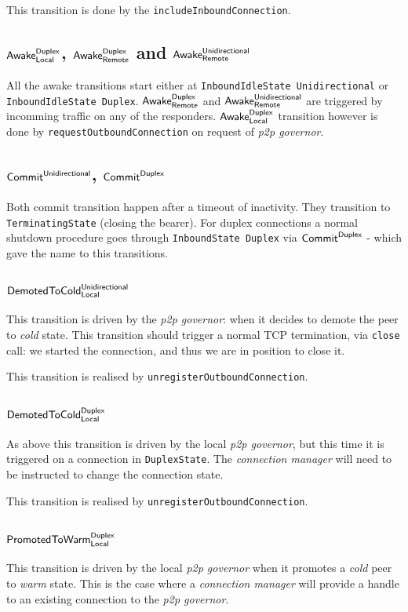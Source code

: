 \documentclass{article}
\def\TCP{\textsf{TCP}}
\def\InboundStateDup{\texttt{InboundState Duplex}}
\def\InboundIdleStateUni{\texttt{InboundIdleState Unidirectional}}
\def\InboundIdleStateDup{\texttt{InboundIdleState Duplex}}
\def\TerminatingState{\texttt{TerminatingState}}
\def\PromotedToWarmDupLoc{$\text{\textsf{PromotedToWarm}}^\text{\textsf{Duplex}}_\text{\textsf{Local}}$}
\def\DemotedToColdDupLoc{$\text{\textsf{DemotedToCold}}^\text{\textsf{Duplex}}_\text{\textsf{Local}}$}
\def\DemotedToColdUniLoc{$\text{\textsf{DemotedToCold}}^\text{\textsf{Unidirectional}}_\text{\textsf{Local}}$}
\def\CommitDup{$\text{\textsf{Commit}}^\text{\textsf{Duplex}}$}
\def\CommitUni{$\text{\textsf{Commit}}^\text{\textsf{Unidirectional}}$}
\def\AwakeDupRem{$\text{\textsf{Awake}}^\text{\textsf{Duplex}}_\text{\textsf{Remote}}$}
\def\AwakeUniRem{$\text{\textsf{Awake}}^\text{\textsf{Unidirectional}}_\text{\textsf{Remote}}$}
\def\AwakeDupLoc{$\text{\textsf{Awake}}^\text{\textsf{Duplex}}_\text{\textsf{Local}}$}
\def\cold{\textit{cold}}
\def\warm{\textit{warm}}
\def\ptopgov{\textit{p2p governor}}
\def\connmngr{\textit{connection manager}}
\begin{document}
This transition is done by the \texttt{includeInboundConnection}.

\subsection{\AwakeDupLoc{}, \AwakeDupRem{} and \AwakeUniRem{}}
All the awake transitions start either at \InboundIdleStateUni{} or
\InboundIdleStateDup{}.  \AwakeDupRem{} and \AwakeUniRem{} are triggered by
incomming traffic on any of the responders. \AwakeDupLoc{} transition however
is done by \texttt{requestOutboundConnection} on request of \ptopgov{}.

\subsection{\CommitUni{}, \CommitDup{}}\label{sec:tr_commit}
Both commit transition happen after a timeout of inactivity.  They transition
to \TerminatingState{} (closing the bearer).  For duplex connections a normal
shutdown procedure goes through \InboundStateDup{} via \CommitDup{} - which
gave the name to this transitions.

\subsection{\DemotedToColdUniLoc{}}
This transition is driven by the \ptopgov{}: when it decides to demote the peer
to \cold{} state.  This transition should trigger a normal \TCP{} termination,
via \texttt{close} call: we started the connection, and thus we are in position
to close it.

This transition is realised by \texttt{unregisterOutboundConnection}.

\subsection{\DemotedToColdDupLoc{}}
As above this transition is driven by the local \ptopgov{}, but this time it is
triggered on a connection in \texttt{DuplexState}.  The \connmngr{} will need
to be instructed to change the connection state.

This transition is realised by \texttt{unregisterOutboundConnection}.

\subsection{\PromotedToWarmDupLoc{}}
This transition is driven by the local \ptopgov{} when it promotes a \cold{} peer
to \warm{} state.  This is the case where a \connmngr{} will provide
a handle to an existing connection to the \ptopgov{}.
\end{document}

